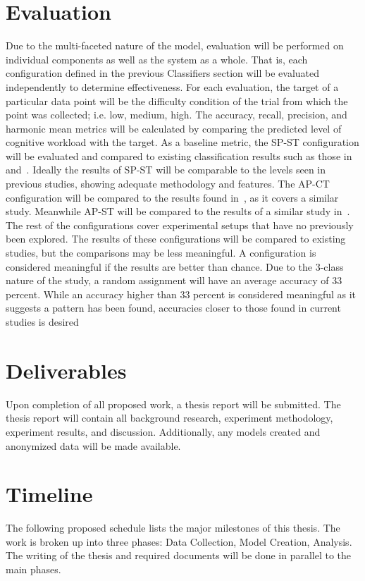 \documentclass[11pt]{article}
\begin{document}
\section{Evaluation}
Due to the multi-faceted nature of the model, evaluation will be performed on individual components as well as the system as a whole. That is, each configuration defined in the previous Classifiers section will be evaluated independently to determine effectiveness. For each evaluation, the target of a particular data point will be the difficulty condition of the trial from which the point was collected; i.e. low, medium, high. The accuracy, recall, precision, and harmonic mean metrics will be calculated by comparing the predicted level of cognitive workload with the target. As a baseline metric, the SP-ST configuration will be evaluated and compared to existing classification results such as those in~\cite{Zhang} and~\cite{Wilson}. Ideally the results of SP-ST will be comparable to the levels seen in previous studies, showing adequate methodology and features. The AP-CT configuration will be compared to the results found in~\cite{Ke}, as it covers a similar study. Meanwhile AP-ST will be compared to the results of a similar study in~\cite{Wang_Z}. The rest of the configurations cover experimental setups that have no previously been explored. The results of these configurations will be compared to existing studies, but the comparisons may be less meaningful. A configuration is considered meaningful if the results are better than chance. Due to the 3-class nature of the study, a random assignment will have an average accuracy of 33 percent. While an accuracy higher than 33 percent is considered meaningful as it suggests a pattern has been found, accuracies closer to those found in current studies is desired

\section{Deliverables}
Upon completion of all proposed work, a thesis report will be submitted. The thesis report will contain all background research, experiment methodology, experiment results, and discussion. Additionally, any models created and anonymized data will be made available. 

\section{Timeline}
The following proposed schedule lists the major milestones of this thesis. The work is broken up into three phases: Data Collection, Model Creation, Analysis. The writing of the thesis and required documents will be done in parallel to the main phases.
\end{document}

